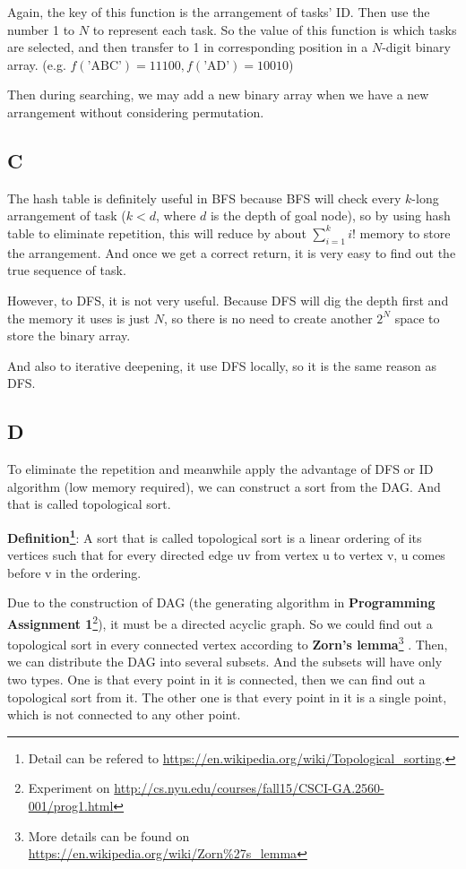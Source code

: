 \documentclass[11pt]{article}
\begin{document}
Again, the key of this function is the arrangement of tasks' ID. Then use the number 1 to $ N $ to represent each task. So the value of this function is which tasks are selected, and then transfer to 1 in corresponding position in a $ N $-digit binary array. (e.g. $ f(\mbox{'ABC'}) = 11100,f(\mbox{'AD'}) = 10010 $)

Then during searching, we may add a new binary array when we have a new arrangement without considering permutation.
\subsection*{C}
The hash table is definitely useful in BFS because BFS will check every $ k $-long arrangement of task ($ k<d $, where $ d $ is the depth of goal node), so by using hash table to eliminate repetition, this will reduce by about $ \sum_{i=1}^{k}i! $ memory to store the arrangement. And once we get a correct return, it is very easy to find out the true sequence of task.

However, to DFS, it is not very useful. Because DFS will dig the depth first and the memory it uses is just $ N $, so there is no need to create another $ 2^N $ space to store the binary array.

And also to iterative deepening, it use DFS locally, so it is the same reason as DFS.
\subsection*{D}
To eliminate the repetition and meanwhile apply the advantage of DFS or ID algorithm (low memory required), we can construct a sort from the DAG. And that is called topological sort.

\textbf{Definition\footnote{Detail can be refered to \url{https://en.wikipedia.org/wiki/Topological_sorting}.}}: A sort that is called topological sort is a linear ordering of its vertices such that for every directed edge uv from vertex u to vertex v, u comes before v in the ordering.

Due to the construction of DAG (the generating algorithm in \textbf{Programming Assignment 1}\footnote{Experiment on \url{http://cs.nyu.edu/courses/fall15/CSCI-GA.2560-001/prog1.html}}), it must be a directed acyclic graph. So we could find out a topological sort in every connected vertex according to \textbf{Zorn's lemma}\footnote{More details can be found on \url{https://en.wikipedia.org/wiki/Zorn\%27s_lemma}}
. Then, we can distribute the DAG into several subsets. And the subsets will have only two types. One is that every point in it is connected, then we can find out a topological sort from it. The other one is that every point in it is a single point, which is not connected to any other point.
\end{document}
